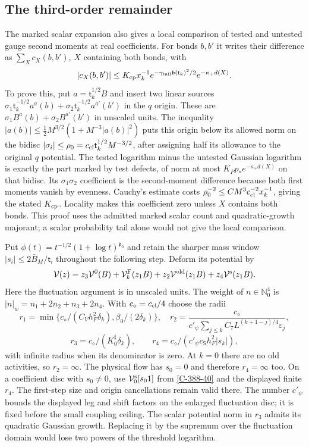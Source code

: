 \documentclass[11pt,letterpaper,reqno]{amsart}
\theoremstyle{definition}
\theoremstyle{remark}
\begin{document}
\subsection{The third-order remainder}

The marked scalar expansion also gives a local comparison
of tested and untested gauge second moments at real
coefficients.  For bonds $b,b'$ it writes their difference
as $\sum_Xc_X(b,b')$, $X$ containing both bonds, with
\[
 |c_X(b,b')|\le K_{\rm cp}x_k^{-1}
 e^{-\gamma_{\rm tail}\mathfrak b(\mathsf t_k)^2/2}
                                  e^{-\kappa_+d(X)}.
\]
To prove this, put $a=\mathsf t_k^{1/2}B$ and insert two linear sources
$\sigma_1\mathsf t_k^{-1/2}a^a(b)+
\sigma_2\mathsf t_k^{-1/2}a^{a'}(b')$ in the $q$ origin.
These are $\sigma_1B^a(b)+\sigma_2B^{a'}(b')$ in unscaled units.
The inequality
$|a(b)|\le\tfrac12M^{3/2}(1+M^{-3}|a(b)|^2)$
puts this origin below its allowed norm on the bidisc
$|\sigma_i|\le\rho_0=c_{\rm cl}\mathsf t_k^{1/2}M^{-3/2}$,
after assigning half its allowance to the original $q$
potential.  The tested logarithm minus the untested
Gaussian logarithm is exactly the part marked by test
defects, of norm at most $K_Pp_*e^{-\kappa_+d(X)}$ on
that bidisc.  Its $\sigma_1\sigma_2$ coefficient is the
second-moment difference because both first moments
vanish by evenness.  Cauchy's estimate costs
$\rho_0^{-2}\le CM^3c_{\rm cl}^{-2}x_k^{-1}$, giving
the stated $K_{\rm cp}$.  Locality makes this coefficient
zero unless $X$ contains both bonds.  This proof uses
the admitted marked scalar count and quadratic-growth
majorant; a scalar probability tail alone would not
give the local comparison.

Put $\phi(t)=t^{-1/2}(1+\log t)^{\mathfrak p_0}$ and
retain the sharper mass window
$|s_i|\le2\bar B_M/\mathsf t_i$ throughout the following step.
Deform its potential by
\[
 \mathcal V(z)=z_3\mathcal V^0(B)+
 \mathcal V_k^{\rm F}(z_1B)+z_2\mathcal V^{\rm old}(z_1B)
                                  +z_4\mathcal V^{\rm s}(z_1B).
\]
Here the fluctuation argument is in unscaled units.
The weight of $n\in\mathbb N_0^4$ is
$|n|_w=n_1+2n_2+n_3+2n_4$.
With $c_\diamond=c_{\rm cl}/4$ choose the radii
\[
 r_1=\min\{c_\diamond/(C_Vh_F^2\delta_k),
                                  \beta_0/(2\delta_k)\},
 \quad r_2=\frac{c_\diamond}
 {c'_\psi\sum_{j\le k}C_7L^{(k+1-j)/4}\varepsilon_j},
\]
\[
 r_3=c_\diamond/(K_0^\sharp\delta_k),\qquad
 r_4=c_\diamond/(c'_\psi c_{\mathsf S}h_F^2|s_k|),
\]
with infinite radius when its denominator is zero.
At $k=0$ there are no old activities, so $r_2=\infty$.
The physical flow has $s_0=0$ and therefore $r_4=\infty$ too.
On a coefficient disc with $s_0\ne0$, use
$\mathcal V^{\rm s}_0[s_0 1]$ from \cref{C-388-40} and the
displayed finite $r_4$.  The first-step size and origin
cancellations remain valid there.
The number $c'_\psi$ bounds the displayed leg and shift
factors on the enlarged fluctuation disc; it is fixed before
the small coupling ceiling.  The scalar potential norm in
$r_3$ admits its quadratic Gaussian growth.  Replacing it
by the supremum over the fluctuation domain would lose
two powers of the threshold logarithm.
\end{document}
